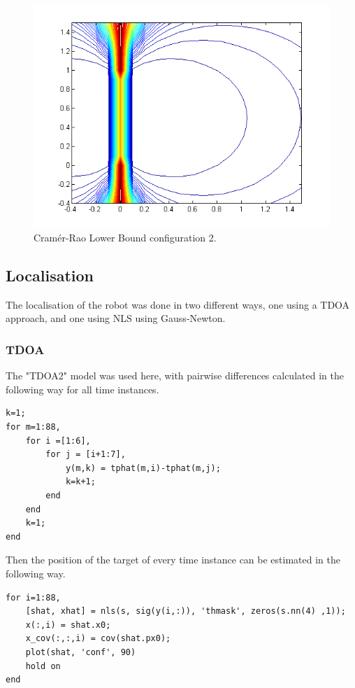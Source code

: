 \documentclass[11pt]{article}
\begin{document}
\begin{figure}
\begin{center}
  \includegraphics[width=\textwidth]{crlb_2.png}
  \caption{Cramér-Rao Lower Bound configuration 2.}
  \end{center}
\end{figure}


\subsection{Localisation}
The localisation of the robot was done in two different ways, one using a TDOA approach, and one using NLS using Gauss-Newton.

\subsubsection{TDOA}
The "TDOA2" model was used here, with pairwise differences calculated in the following way for all time instances.

\begin{verbatim}
k=1;
for m=1:88,
    for i =[1:6],
        for j = [i+1:7],
            y(m,k) = tphat(m,i)-tphat(m,j);
            k=k+1;
        end
    end
    k=1;
end
\end{verbatim}
Then the position of the target of every time instance can be estimated in the following way.
\begin{verbatim}
for i=1:88,
    [shat, xhat] = nls(s, sig(y(i,:)), 'thmask', zeros(s.nn(4) ,1));    
    x(:,i) = shat.x0;
    x_cov(:,:,i) = cov(shat.px0);
    plot(shat, 'conf', 90)
    hold on
end
\end{verbatim}
\end{document}
